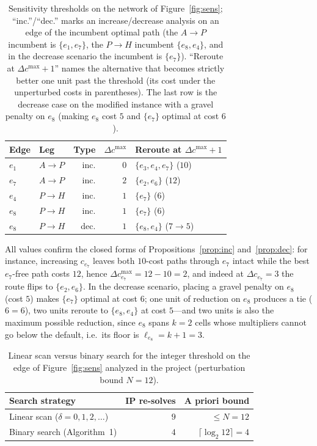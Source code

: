 \documentclass[10pt,twocolumn]{article}
\begin{document}
\begin{table}[t]
\centering
\caption{Sensitivity thresholds on the network of Figure~\ref{fig:sens}; ``inc.''/``dec.''
marks an increase/decrease analysis on an edge of the incumbent optimal path (the $A\to P$
incumbent is $\{e_1,e_7\}$, the $P\to H$ incumbent $\{e_8,e_4\}$, and in the decrease
scenario the incumbent is $\{e_7\}$). ``Reroute at $\Delta c^{\max}+1$'' names the
alternative that becomes strictly better one unit past the threshold (its cost under the
unperturbed costs in parentheses). The last row is the decrease case on the modified
instance with a gravel penalty on $e_8$ (making $e_8$ cost $5$ and $\{e_7\}$ optimal at
cost $6$).}
\label{tab:sens}
\footnotesize
\setlength{\tabcolsep}{4pt}
\begin{tabular}{@{}llrrl@{}}
\toprule
Edge & Leg & Type & $\Delta c^{\max}$ & Reroute at $\Delta c^{\max}+1$ \\
\midrule
$e_1$ & $A\to P$ & inc. & $0$ & $\{e_3,e_4,e_7\}$ ($10$) \\
$e_7$ & $A\to P$ & inc. & $2$ & $\{e_2,e_6\}$ ($12$) \\
$e_4$ & $P\to H$ & inc. & $1$ & $\{e_7\}$ ($6$) \\
$e_8$ & $P\to H$ & inc. & $1$ & $\{e_7\}$ ($6$) \\
$e_8$ & $P\to H$ & dec. & $1$ & $\{e_8,e_4\}$ ($7\to5$) \\
\bottomrule
\end{tabular}
\end{table}

All values confirm the closed forms of Propositions~\ref{prop:inc} and~\ref{prop:dec}: for
instance, increasing $c_{e_7}$ leaves both $10$-cost paths through $e_7$ intact while the
best $e_7$-free path costs $12$, hence $\Delta c^{\max}_{e_7}=12-10=2$, and indeed at
$\Delta c_{e_7}=3$ the route flips to $\{e_2,e_6\}$. In the decrease scenario, placing a
gravel penalty on $e_8$ (cost $5$) makes $\{e_7\}$ optimal at cost $6$; one unit of
reduction on $e_8$ produces a tie ($6=6$), two units reroute to $\{e_8,e_4\}$ at cost
$5$---and two units is also the maximum possible reduction, since $e_8$ spans $k=2$ cells
whose multipliers cannot go below the default, i.e.\ its floor is $\ell_{e_8}=k+1=3$.

\begin{table}[t]
\centering
\caption{Linear scan versus binary search for the integer threshold on the edge of
Figure~\ref{fig:sens} analyzed in the project (perturbation bound $N=12$).}
\label{tab:search}
\footnotesize
\setlength{\tabcolsep}{4pt}
\begin{tabular}{@{}lrr@{}}
\toprule
Search strategy & IP re-solves & A priori bound \\
\midrule
Linear scan ($\delta=0,1,2,\dots$) & $9$ & $\le N=12$ \\
Binary search (Algorithm~1)          & $4$ & $\lceil\log_2 12\rceil=4$ \\
\bottomrule
\end{tabular}
\end{table}
\end{document}
